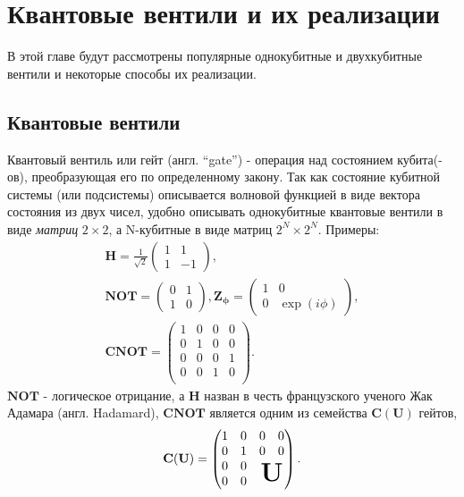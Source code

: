 \documentclass[12pt, twoside]{report}
\numberwithin{equation}{section}
\numberwithin{figure}{section}
\begin{document}
\section{Квантовые вентили и их реализации}
В этой главе будут рассмотрены популярные однокубитные и двухкубитные вентили и некоторые способы их реализации.
\subsection{Квантовые вентили}
Квантовый вентиль или гейт (англ. ``gate'') - операция над состоянием кубита(-ов), преобразующая его по определенному закону. \newline
Так как состояние кубитной системы (или подсистемы) описывается волновой функцией в виде вектора состояния из двух чисел, удобно описывать однокубитные квантовые вентили в виде \textit{матриц} $2 \times 2$, а N-кубитные в виде матриц $2^N \times 2^N$. Примеры:
\begin{gather}
\mathbf{H} = \frac{1}{\sqrt{2}}
\begin{pmatrix}
1 & 1 \\
1 & -1
\end{pmatrix}, \\
\mathbf{NOT} = 
\begin{pmatrix}
0 & 1 \\
1 & 0
\end{pmatrix}, 
\mathbf{Z_\phi} = 
\begin{pmatrix}
1 & 0 \\
0 & \exp \left( i \phi \right)
\end{pmatrix}, \\
\mathbf{CNOT} = 
\begin{pmatrix}
1 & 0 & 0 & 0 \\
0 & 1 & 0 & 0 \\
0 & 0 & 0 & 1 \\
0 & 0 & 1 & 0 \\
\end{pmatrix}.
\end{gather}
$\mathbf{NOT}$ - логическое отрицание, а $\mathbf{H}$ назван в честь французского ученого Жак Адамара (англ. Hadamard), 
$\mathbf{CNOT}$ является одним из семейства $\mathbf{C(U)}$ гейтов,
\begin{gather}
\mathbf{C ( U )} = 
\begin{pmatrix}
1 & 0 & 0 & 0 \\
0 & 1 & 0 & 0 \\
0 & 0 & \multicolumn{2}{c}{\multirow{2}{*}{\text{\huge \textbf{U}}}} \\
0 & 0 & \\
\end{pmatrix}.
\end{gather}
\end{document}
